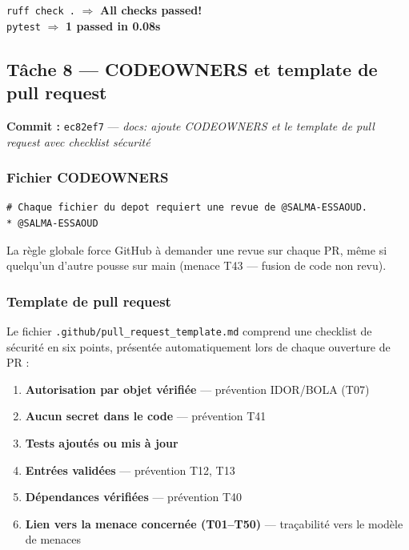 \documentclass[11pt,a4paper]{article}
\begin{document}
\begin{successbox}
\texttt{ruff check .} $\Rightarrow$ \textbf{All checks passed!}\\
\texttt{pytest} $\Rightarrow$ \textbf{1 passed in 0.08s}
\end{successbox}

\subsection{Tâche 8 --- CODEOWNERS et template de pull request}

\textbf{Commit :} \texttt{ec82ef7} --- \textit{docs: ajoute CODEOWNERS et le template de pull
request avec checklist sécurité}

\subsubsection*{Fichier CODEOWNERS}

\begin{lstlisting}[caption={.github/CODEOWNERS}]
# Chaque fichier du depot requiert une revue de @SALMA-ESSAOUD.
* @SALMA-ESSAOUD
\end{lstlisting}

La règle globale force GitHub à demander une revue sur chaque PR, même si quelqu'un d'autre
pousse sur main (menace T43 --- fusion de code non revu).

\subsubsection*{Template de pull request}

Le fichier \texttt{.github/pull\_request\_template.md} comprend une checklist de sécurité
en six points, présentée automatiquement lors de chaque ouverture de PR :

\begin{enumerate}
  \item \textbf{Autorisation par objet vérifiée} --- prévention IDOR/BOLA (T07)
  \item \textbf{Aucun secret dans le code} --- prévention T41
  \item \textbf{Tests ajoutés ou mis à jour}
  \item \textbf{Entrées validées} --- prévention T12, T13
  \item \textbf{Dépendances vérifiées} --- prévention T40
  \item \textbf{Lien vers la menace concernée (T01--T50)} --- traçabilité vers le modèle
    de menaces
\end{enumerate}
\end{document}
